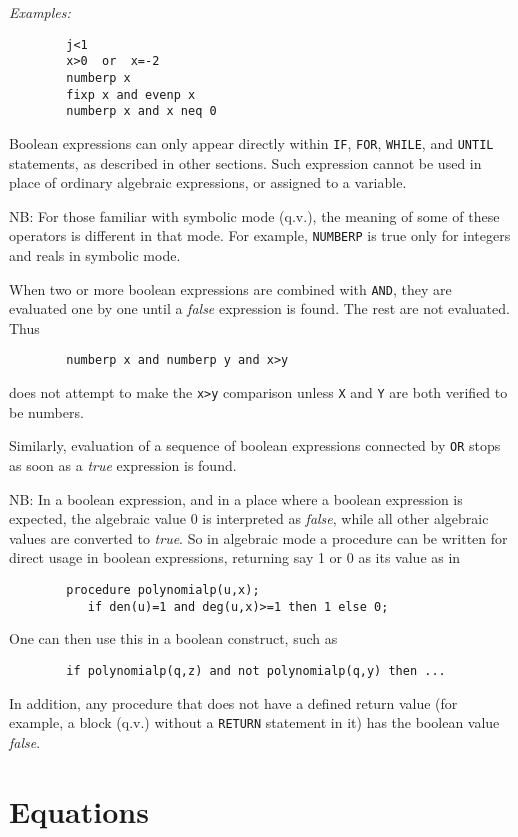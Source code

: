 {\it Examples:}
\begin{verbatim}
        j<1
        x>0  or  x=-2
        numberp x
        fixp x and evenp x
        numberp x and x neq 0
\end{verbatim}
Boolean expressions can only appear directly within {\tt IF}, {\tt FOR},
{\tt WHILE}, and {\tt UNTIL} statements, as described in other sections.
Such expression cannot be used in place of ordinary algebraic expressions,
or assigned to a variable.

NB:  For those familiar with symbolic mode (q.v.), the meaning of some of
these operators is different in that mode.  For example, {\tt NUMBERP} is
true only for integers and reals in symbolic mode.

When two or more boolean expressions are combined with {\tt AND}, they are
evaluated one by one until a {\em false} expression is found. The rest are
not evaluated. Thus
\begin{verbatim}
        numberp x and numberp y and x>y
\end{verbatim}
does not attempt to make the {\tt x>y} comparison unless {\tt X} and {\tt Y}
are both verified to be numbers.

Similarly, evaluation of a sequence of boolean expressions connected by
{\tt OR} stops as soon as a {\em true} expression is found.

NB:  In a boolean expression, and in a place where a boolean expression is
expected, the algebraic value 0 is interpreted as {\em false}, while all
other algebraic values are converted to {\em true}.  So in algebraic mode
a procedure can be written for direct usage in boolean expressions,
returning say 1 or 0 as its value as in

\begin{verbatim}
        procedure polynomialp(u,x);
           if den(u)=1 and deg(u,x)>=1 then 1 else 0;
\end{verbatim}

One can then use this in a boolean construct, such as
\begin{verbatim}
        if polynomialp(q,z) and not polynomialp(q,y) then ...
\end{verbatim}

In addition, any procedure that does not have a defined return value
(for example, a block (q.v.) without a {\tt RETURN} statement in it)
has the boolean value {\em false}. 

\section{Equations}

